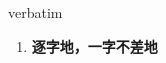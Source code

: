 
\begin{frame}
{\huge verbatim}
\begin{center}
\begin{enumerate}\Large
  \item \textbf{逐字地，一字不差地}
\end{enumerate}
\end{center}
\end{frame}
